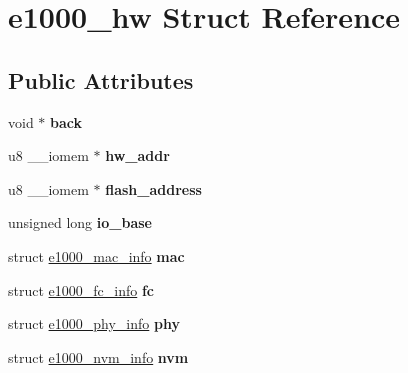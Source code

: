\hypertarget{structe1000__hw}{
\section{e1000\_\-hw Struct Reference}
\label{structe1000__hw}
}
\subsection*{Public Attributes}
\begin{DoxyCompactItemize}
\item 
\hypertarget{structe1000__hw_ac683aa2e14c85e2b77ac6fca424dc7db}{
void $\ast$ {\bfseries back}}
\label{structe1000__hw_ac683aa2e14c85e2b77ac6fca424dc7db}

\item 
\hypertarget{structe1000__hw_afbe68074f1447853310c72930c2dd0e5}{
u8 \_\-\_\-iomem $\ast$ {\bfseries hw\_\-addr}}
\label{structe1000__hw_afbe68074f1447853310c72930c2dd0e5}

\item 
\hypertarget{structe1000__hw_aa2cfea0510f72390b015c4bc0ff712e9}{
u8 \_\-\_\-iomem $\ast$ {\bfseries flash\_\-address}}
\label{structe1000__hw_aa2cfea0510f72390b015c4bc0ff712e9}

\item 
\hypertarget{structe1000__hw_a8f57d4676a19f0e1d649edef3345b256}{
unsigned long {\bfseries io\_\-base}}
\label{structe1000__hw_a8f57d4676a19f0e1d649edef3345b256}

\item 
\hypertarget{structe1000__hw_a6a1fb05566cea375c7ae3abdee093ad6}{
struct \hyperlink{structe1000__mac__info}{e1000\_\-mac\_\-info} {\bfseries mac}}
\label{structe1000__hw_a6a1fb05566cea375c7ae3abdee093ad6}

\item 
\hypertarget{structe1000__hw_ac89d5776dfeaa4962c6a4017958d0d4c}{
struct \hyperlink{structe1000__fc__info}{e1000\_\-fc\_\-info} {\bfseries fc}}
\label{structe1000__hw_ac89d5776dfeaa4962c6a4017958d0d4c}

\item 
\hypertarget{structe1000__hw_aea1c0d5f50dd587c46f0828fb1fe1055}{
struct \hyperlink{structe1000__phy__info}{e1000\_\-phy\_\-info} {\bfseries phy}}
\label{structe1000__hw_aea1c0d5f50dd587c46f0828fb1fe1055}

\item 
\hypertarget{structe1000__hw_a7da8a8328803abd295ca8691e964c202}{
struct \hyperlink{structe1000__nvm__info}{e1000\_\-nvm\_\-info} {\bfseries nvm}}
\label{structe1000__hw_a7da8a8328803abd295ca8691e964c202}


\end{DoxyCompactItemize}
